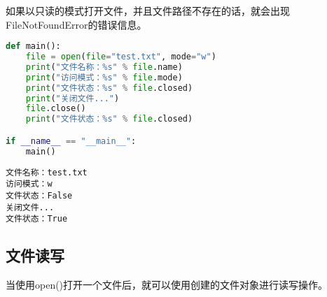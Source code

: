 如果以只读的模式打开文件，并且文件路径不存在的话，就会出现FileNotFoundError的错误信息。\\


\begin{lstlisting}[language=Python]
def main():
	file = open(file="test.txt", mode="w")
	print("文件名称：%s" % file.name)
	print("访问模式：%s" % file.mode)
	print("文件状态：%s" % file.closed)
	print("关闭文件...")
	file.close()
	print("文件状态：%s" % file.closed)

if __name__ == "__main__":
	main()
\end{lstlisting}

\begin{tcolorbox}
	\begin{verbatim}
文件名称：test.txt
访问模式：w
文件状态：False
关闭文件...
文件状态：True
\end{verbatim}
\end{tcolorbox}

\vspace{0.5cm}

\subsection{文件读写}

当使用open()打开一个文件后，就可以使用创建的文件对象进行读写操作。

\begin{table}[H]
	\centering
	\caption{文件读写}
\end{table}

